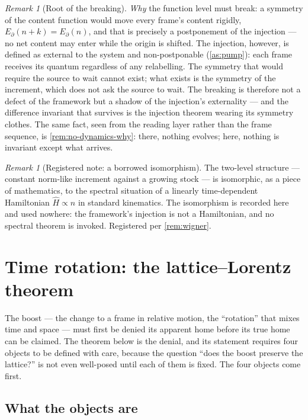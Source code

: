 \documentclass[11pt]{amsbook}
\theoremstyle{plain}
\theoremstyle{definition}
\theoremstyle{remark}
\newtheorem{remark}[theorem]{Remark}
\begin{document}
\begin{remark}[Root of the breaking]\label{rem:root-breaking}
\emph{Why} the function level must break: a symmetry of the content function would move every frame's content rigidly, $E_{\partial}(n+k) = E_{\partial}(n)$, and that is precisely a postponement of the injection --- no net content may enter while the origin is shifted. The injection, however, is defined as external to the system and non-postponable (\cref{as:pump}): each frame receives its quantum regardless of any relabelling. The symmetry that would require the source to wait cannot exist; what exists is the symmetry of the increment, which does not ask the source to wait. The breaking is therefore not a defect of the framework but a shadow of the injection's externality --- and the difference invariant that survives is the injection theorem wearing its symmetry clothes. The same fact, seen from the reading layer rather than the frame sequence, is \cref{rem:no-dynamics-why}: there, nothing evolves; here, nothing is invariant except what arrives.
\end{remark}

\begin{remark}[Registered note: a borrowed isomorphism]\label{rem:b1-registered}
The two-level structure --- constant norm-like increment against a growing stock --- is isomorphic, as a piece of mathematics, to the spectral situation of a linearly time-dependent Hamiltonian $\hat H \propto n$ in standard kinematics. The isomorphism is recorded here and used nowhere: the framework's injection is not a Hamiltonian, and no spectral theorem is invoked. Registered per \cref{rem:wigner}.
\end{remark}

\section{Time rotation: the lattice--Lorentz theorem}\label{sec:lattice-lorentz}

The boost --- the change to a frame in relative motion, the ``rotation'' that mixes time and space --- must first be denied its apparent home before its true home can be claimed. The theorem below is the denial, and its statement requires four objects to be defined with care, because the question ``does the boost preserve the lattice?'' is not even well-posed until each of them is fixed. The four objects come first.

\subsection{What the objects are}\label{sec:audit}
\end{document}
